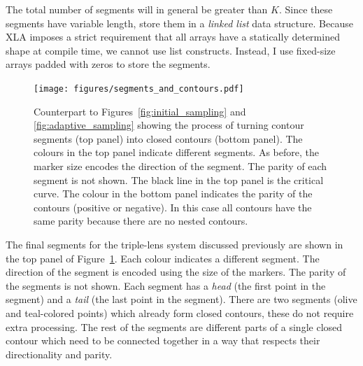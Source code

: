 \documentclass[12pt,dvipsnames]{report}
\newcommand{\ssf}[1]{\textsf{#1}}
\begin{document}
The total number of segments will in general be greater than $K$. Since these segments have 
variable length, \citet{2021MNRAS.503.6143K} store them in a 
\emph{linked list} data structure. Because \ssf{XLA} imposes a strict requirement that all 
arrays have a statically determined shape at compile time, we cannot use list constructs. 
Instead, I use fixed-size arrays padded with zeros to store the segments. 
\begin{figure}[t]
    \begin{centering}
        \texttt{[image: figures/segments\_and\_contours.pdf]}
        \caption{Counterpart to Figures~\ref{fig:initial_sampling} and \ref{fig:adaptive_sampling} 
        showing the process of turning contour segments (top panel) into closed contours (bottom
        panel). The colours in the top panel indicate different segments. As before, the marker 
        size encodes the direction of the segment. The parity of each segment is not shown.
        The black line in the top panel is the critical curve. The colour in the bottom 
        panel indicates the parity of the contours (positive or negative). In this case all 
        contours have the  same parity because there are no nested contours.}
        \label{fig:segments_and_contours}
    \end{centering}
\end{figure}

The final segments for the triple-lens system discussed previously are shown in the top panel 
of Figure~\ref{fig:segments_and_contours}. Each colour indicates a different segment. 
The direction of the segment is encoded using the size of the markers. 
The parity of the segments is not shown.
Each segment has a \emph{head}  (the first point in the segment) 
and a \emph{tail} (the last point in the segment).
There are two segments (olive and teal-colored points) which already form closed contours, these
do not require extra processing. The rest of the segments are different parts of a single
closed contour which need to be connected together in a way that respects their directionality 
and parity. 
\end{document}
